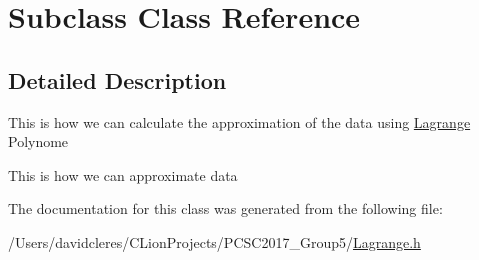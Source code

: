 \hypertarget{class_subclass}{}\section{Subclass Class Reference}
\label{class_subclass}


\subsection{Detailed Description}
This is how we can calculate the approximation of the data using \mbox{\hyperlink{class_lagrange}{Lagrange}} Polynome

This is how we can approximate data 

The documentation for this class was generated from the following file\+:\begin{DoxyCompactItemize}
\item 
/\+Users/davidcleres/\+C\+Lion\+Projects/\+P\+C\+S\+C2017\+\_\+\+Group5/\mbox{\hyperlink{_lagrange_8h}{Lagrange.\+h}}\end{DoxyCompactItemize}
